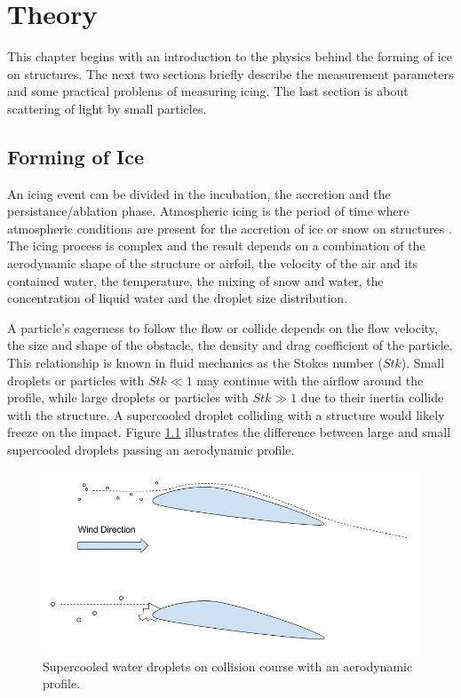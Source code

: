 
\chapter{Theory}
\label{chap:theory}

This chapter begins with an introduction to the physics behind the forming of ice on structures. The next two sections briefly describe the measurement parameters and some practical problems of measuring icing. The last section is about scattering of light by small particles.

\section{Forming of Ice}

An icing event can be divided in the incubation, the accretion and the persistance/ablation phase. Atmospheric icing is the period of time where atmospheric conditions are present for the accretion of ice or snow on structures \cite{iea2017}. The icing process is complex and the result depends on a combination of the aerodynamic shape of the structure or airfoil, the velocity of the air and its contained water, the temperature, the mixing of snow and water, the concentration of liquid water and the droplet size distribution.

A particle’s eagerness to follow the flow or collide depends on the flow velocity, the size and shape of the obstacle, the density and drag coefficient of the particle. This relationship is known in fluid mechanics as the Stokes number ($Stk$). Small droplets or particles with $Stk \ll1$ may continue with the airflow around the profile, while large droplets or particles with $Stk \gg 1$ due to their inertia collide with the structure. A supercooled droplet colliding with a structure would likely freeze on the impact. Figure \ref{fig:freezedrops} illustrates the difference between large and small supercooled droplets passing an aerodynamic profile.

\begin{figure}%
\centering\includegraphics[width=0.8\linewidth]{./figures/freezing_droplets.jpg}
\caption{Supercooled water droplets on collision course with an aerodynamic profile.}
\label{fig:freezedrops}
\end{figure}

